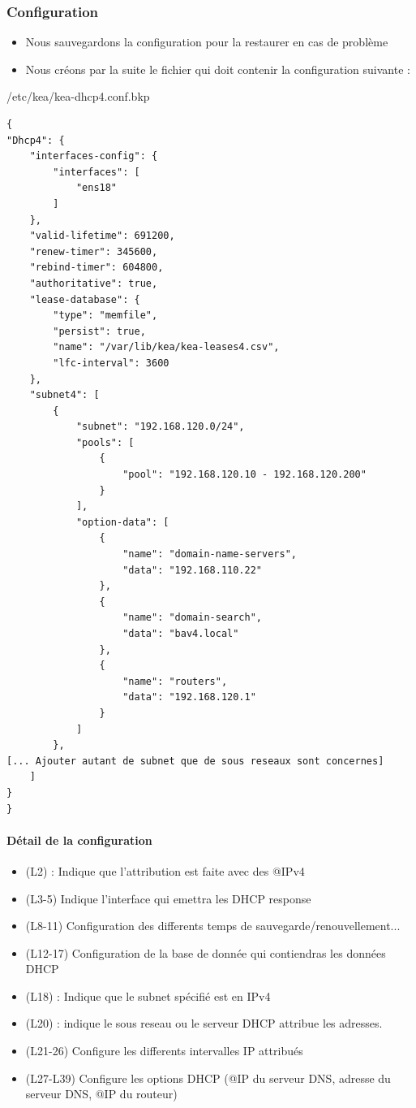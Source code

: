 \documentclass{article}
\begin{document}
\subsubsection{Configuration}
\begin{itemize}
    \item Nous sauvegardons la configuration pour la restaurer en cas de problème 
    \item Nous créons par la suite le fichier  qui doit contenir la configuration suivante :
\end{itemize}
    \newpage
\begin{configbox}{/etc/kea/kea-dhcp4.conf.bkp}
    \begin{lstlisting}
{
"Dhcp4": {
	"interfaces-config": {
		"interfaces": [
			"ens18"
		]
	},
	"valid-lifetime": 691200,
	"renew-timer": 345600,
	"rebind-timer": 604800,
	"authoritative": true,
	"lease-database": {
		"type": "memfile",
		"persist": true,
		"name": "/var/lib/kea/kea-leases4.csv",
		"lfc-interval": 3600
	},
	"subnet4": [
		{
			"subnet": "192.168.120.0/24",
			"pools": [
				{
					"pool": "192.168.120.10 - 192.168.120.200"
				}
			],
			"option-data": [
				{
					"name": "domain-name-servers",
					"data": "192.168.110.22"
				},
				{
					"name": "domain-search",
					"data": "bav4.local"
				},
				{
					"name": "routers",
					"data": "192.168.120.1"
				}
			]
		},
[... Ajouter autant de subnet que de sous reseaux sont concernes]
	]
}
}
    \end{lstlisting}
\end{configbox}
\paragraph{Détail de la configuration}
\begin{itemize}
	\item (L2)  : Indique que l'attribution est faite avec des @IPv4
	\item (L3-5) Indique l'interface qui emettra les DHCP response
	\item (L8-11) Configuration des differents temps de sauvegarde/renouvellement...
	\item (L12-17) Configuration de la base de donnée qui contiendras les données DHCP
	\item (L18)  : Indique que le subnet spécifié est en IPv4
	\item (L20)  : indique le sous reseau ou le serveur DHCP attribue les adresses.
	\item (L21-26) Configure les differents intervalles IP attribués
	\item (L27-L39) Configure les options DHCP (@IP du serveur DNS, adresse du serveur DNS, @IP du routeur)
\end{itemize}
\end{document}
